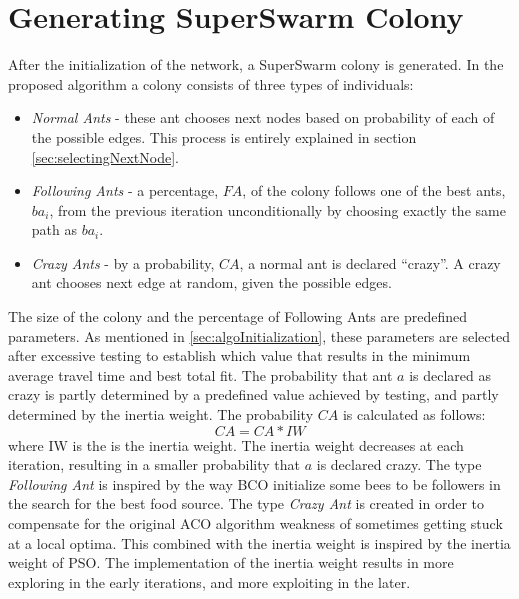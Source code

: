 \section{Generating SuperSwarm Colony}
After the initialization of the network, a SuperSwarm colony is generated. In the proposed algorithm a colony consists of three types of individuals:
\begin{itemize}
\item \textit{Normal Ants} - these ant chooses next nodes based on probability of each of the possible edges. This process is entirely explained in section \vref{sec:selectingNextNode}.
\item \textit{Following Ants} - a percentage, $FA$, of the colony follows one of the best ants, $ba_i$, from the previous iteration unconditionally by choosing exactly the same path as $ba_i$.
\item \textit{Crazy Ants} - by a probability, $CA$, a normal ant is declared ``crazy''. A crazy ant chooses next edge at random, given the possible edges.  
\end{itemize}

The size of the colony and the percentage of Following Ants are predefined parameters. As mentioned in \vref{sec:algoInitialization}, these parameters are selected after excessive testing to establish which value that results in the minimum average travel time and best total fit. The probability that ant $a$ is declared as crazy is partly determined by a predefined value achieved by testing, and partly determined by the inertia weight. The probability $CA$ is calculated as follows: 
\newline
$$CA = CA*IW$$
\newline
where IW is the is the inertia weight. %
The inertia weight decreases at each iteration, resulting in a smaller probability that $a$ is declared crazy. The type \textit{Following Ant} is inspired by the way BCO initialize some bees to be followers in the search for the best food source. The type \textit{Crazy Ant} is created in order to compensate for the original ACO algorithm weakness of sometimes getting stuck at a local optima. This combined with the inertia weight is inspired by the inertia weight of PSO. The implementation of the inertia weight results in more exploring in the early iterations, and more exploiting in the later. 